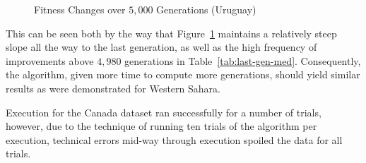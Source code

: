 \begin{figure}[h]
	\centering
	\caption{Fitness Changes over $5,000$ Generations (Uruguay)\label{fig:med-fitnesses}}
\end{figure}
This can be seen both by the way that Figure~\ref{fig:med-fitnesses}
maintains a relatively steep slope all the way to the last generation, 
as well as the high frequency of improvements above $4,980$ generations in
Table~\ref{tab:last-gen-med}.
Consequently, the algorithm, given more time to compute more generations,
should yield similar results as were demonstrated for Western Sahara.

Execution for the Canada dataset ran successfully for a number of trials,
however, due to the technique of running ten trials of the algorithm per execution,
technical errors mid-way through execution spoiled the data for all trials. 
